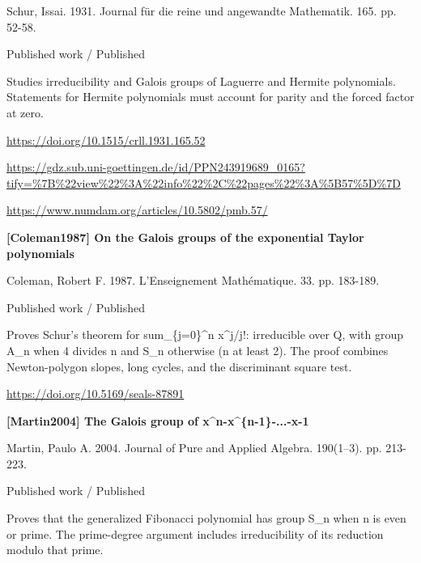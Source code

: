 \documentclass[11pt,a4paper,oneside,openany]{book}
\begin{document}
\color{black} Schur, Issai. 1931. Journal für die reine und angewandte Mathematik. 165. pp. 52-58.\par
{\small\sffamily\color{atlasgold}Published work / Published}\par
\color{black} Studies irreducibility and Galois groups of Laguerre and Hermite polynomials. Statements for Hermite polynomials must account for parity and the forced factor at zero.\par
{\footnotesize\url{https://doi.org/10.1515/crll.1931.165.52}}\par
{\footnotesize\url{https://gdz.sub.uni-goettingen.de/id/PPN243919689_0165?tify=%7B%22view%22%3A%22info%22%2C%22pages%22%3A%5B57%5D%7D}}\par
{\footnotesize\url{https://www.numdam.org/articles/10.5802/pmb.57/}}\par
\vspace{9pt}
\hypertarget{ref:Coleman1987}{}
{\sffamily\bfseries\color{atlasgreen}[Coleman1987] On the Galois groups of the exponential Taylor polynomials}\par
\color{black} Coleman, Robert F. 1987. L'Enseignement Mathématique. 33. pp. 183-189.\par
{\small\sffamily\color{atlasgold}Published work / Published}\par
\color{black} Proves Schur's theorem for sum\_\allowbreak{}\{j=0\}\textasciicircum{}n x\textasciicircum{}j/j!: irreducible over Q, with group A\_\allowbreak{}n when 4 divides n and S\_\allowbreak{}n otherwise (n at least 2). The proof combines Newton-polygon slopes, long cycles, and the discriminant square test.\par
{\footnotesize\url{https://doi.org/10.5169/seals-87891}}\par
\vspace{9pt}
\hypertarget{ref:Martin2004}{}
{\sffamily\bfseries\color{atlasgreen}[Martin2004] The Galois group of x\textasciicircum{}n-x\textasciicircum{}\{n-1\}-...-x-1}\par
\color{black} Martin, Paulo A. 2004. Journal of Pure and Applied Algebra. 190(1--3). pp. 213-223.\par
{\small\sffamily\color{atlasgold}Published work / Published}\par
\color{black} Proves that the generalized Fibonacci polynomial has group S\_\allowbreak{}n when n is even or prime. The prime-degree argument includes irreducibility of its reduction modulo that prime.\par
\end{document}
